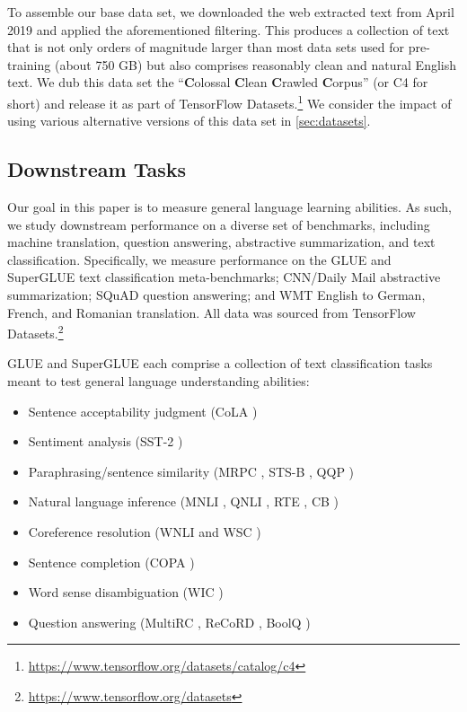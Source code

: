 To assemble our base data set, we downloaded the web extracted text from April 2019 and applied the aforementioned filtering. This produces a collection of text that is not only orders of magnitude larger than most data sets used for pre-training (about 750 GB) but also comprises reasonably clean and natural English text. We dub this data set the ``\textbf{C}olossal \textbf{C}lean \textbf{C}rawled \textbf{C}orpus'' (or C4 for short) and release it as part of TensorFlow Datasets.\footnote{\url{https://www.tensorflow.org/datasets/catalog/c4}}
We consider the impact of using various alternative versions of this data set in \ref{sec:datasets}.

\subsection{Downstream Tasks}
\label{sec:tasks}

Our goal in this paper is to measure general language learning abilities. As such, we study downstream performance on a diverse set of benchmarks, including machine translation, question answering, abstractive summarization, and text classification. Specifically, we measure performance on the GLUE and SuperGLUE text classification meta-benchmarks; CNN/Daily Mail abstractive summarization; SQuAD question answering; and WMT English to German, French, and Romanian translation. All data was sourced from TensorFlow Datasets.\footnote{\url{https://www.tensorflow.org/datasets}}

GLUE \citep{wang2018glue} and SuperGLUE \citep{wang2019superglue} each comprise a collection of text classification tasks meant to test general language understanding abilities:

\begin{itemize}
  \item Sentence acceptability judgment (CoLA \citep{warstadt2018neural})
  \item Sentiment analysis (SST-2 \citep{socher2013recursive})
  \item Paraphrasing/sentence similarity (MRPC \citep{dolan2005automatically}, STS-B \citep{cer2017semeval}, QQP \citep{shankar2017first})
  \item Natural language inference (MNLI \citep{williams2017broad}, QNLI \citep{rajpurkar2016squad}, RTE \citep{dagan2005pascal}, CB \citep{de2019commitmentbank})
  \item Coreference resolution (WNLI and WSC \citep{levesque2012winograd})
  \item Sentence completion (COPA \citep{roemmele2011choice})
  \item Word sense disambiguation (WIC \citep{pilehvar2018wic})
  \item Question answering (MultiRC \citep{khashabi2018looking}, ReCoRD \citep{zhang2018record}, BoolQ \citep{clark2019boolq})
\end{itemize}

